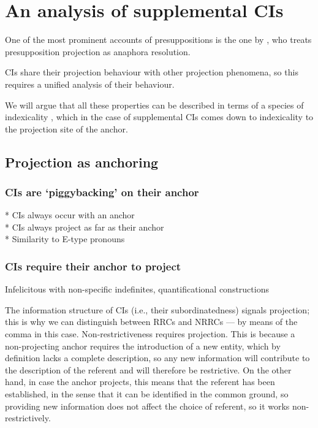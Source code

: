 \section{An analysis of supplemental CIs}

One of the most prominent accounts of presuppositions is the one by
\citet{sandt1992presupposition}, who treats presupposition projection as
anaphora resolution.

CIs share their projection behaviour with other projection phenomena, so this
requires a unified analysis of their behaviour.

%

We will argue that all these properties can be described in terms of
a species of indexicality \citep[cf.][]{amaral2007review}, which in the case
of supplemental CIs comes down to indexicality to the projection site of the
anchor.

\subsection{Projection as anchoring}

\subsubsection{CIs are `piggybacking' on their anchor}

* CIs always occur with an anchor\\
* CIs always project as far as their anchor\\
* Similarity to E-type pronouns

\subsubsection{CIs require their anchor to project}

Infelicitous with non-specific indefinites, quantificational constructions

The information structure of CIs (i.e., their subordinatedness) signals
projection; this is why we can distinguish between RRCs and NRRCs --- by
means of the comma in this case. Non-restrictiveness requires projection.
This is because a non-projecting anchor requires the introduction of a new
entity, which by definition lacks a complete description, so any new
information will contribute to the description of the referent and will
therefore be restrictive. On the other hand, in case the anchor projects,
this means that the referent has been established, in the sense that it can
be identified in the common ground, so providing new information does not
affect the choice of referent, so it works non-restrictively.

